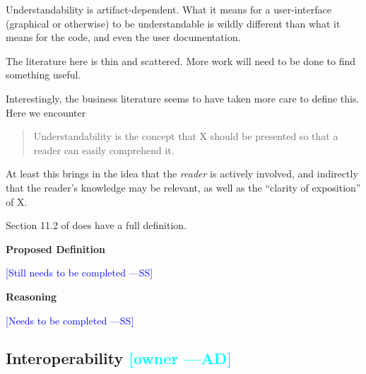 \documentclass[letterpaper,cleveref]{lipics-v2019}
\newcommand{\authornote}[3]{\textcolor{#1}{[#3 ---#2]}}
\newcommand{\authornote}[3]{}
\newcommand{\wss}[1]{\authornote{blue}{SS}{#1}} %
\newcommand{\ad}[1]{\authornote{cyan}{AD}{#1}} %
\theoremstyle{definition}
\begin{document}
Understandability is artifact-dependent. What it means for a user-interface (graphical
or otherwise) to be understandable is wildly different than what it means for the code,
and even the user documentation.

The literature here is thin and scattered.  More work will need to be done to find
something useful.

Interestingly, the business literature seems to have taken more care to define this.
Here we encounter
\begin{quote}
Understandability is the concept that X should be presented
so that a reader can easily comprehend it.
\end{quote}
At least this brings in the idea that the \emph{reader} is actively involved, and
indirectly that the reader's knowledge may be relevant, as well as the
``clarity of exposition'' of X.

Section 11.2 of \citet{adams2015nonfunctional} does have a full definition.

\noindent \textbf{Proposed Definition}

\wss{Still needs to be completed}

\noindent \textbf{Reasoning}

\wss{Needs to be completed}

\subsection{Interoperability \ad{owner}}
\end{document}
